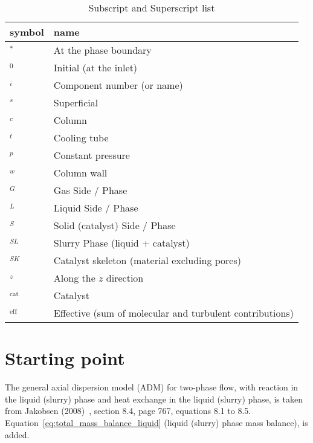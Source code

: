 \documentclass{article}
\begin{document}
\begin{table}[tb]
	\caption{Subscript and Superscript list}
	\label{tab:subscripts_and_superscripts}
	\begin{center}
		\begin{tabular}{ll}
		\hline

		\hline
		\textbf{symbol} & \textbf{name}\\
		\hline	
			$^*$ & At the phase boundary  \\
			$^0$ & Initial (at the inlet) \\
			$_i$ & Component number (or name) \\
			$^s$ & Superficial \\
			$_c$ & Column \\
			$_t$ & Cooling tube \\
			$_p$ & Constant pressure \\
			$_w$ & Column wall \\
			$_G$ & Gas Side / Phase \\
			$_L$ & Liquid Side / Phase \\
			$_S$ & Solid (catalyst) Side / Phase \\
			$_{SL}$ & Slurry Phase (liquid + catalyst) \\
			$_{SK}$ & Catalyst skeleton (material excluding pores) \\
			$_z$ & Along the $z$ direction \\	
			$_{\mathrm{cat}}$ & Catalyst \\
			$_{\mathrm{eff}}$ & Effective (sum of molecular and turbulent contributions)\\
		\hline

		\hline
		\end{tabular}
	\end{center}
\end{table}
\clearpage

\section{Starting point}
The general axial dispersion model (ADM) for two-phase flow, with reaction in the liquid (slurry) phase and heat exchange in the liquid (slurry) phase, is taken from Jakobsen (2008)~\cite{Jakobsen08}, section 8.4, page 767, equations 8.1 to 8.5. Equation~\ref{eq:total_mass_balance_liquid} (liquid (slurry) phase mass balance), is added.
\end{document}
